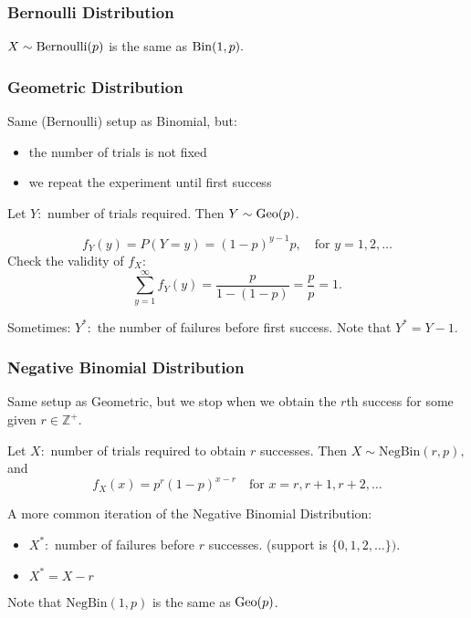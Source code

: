 \subsubsection{Bernoulli Distribution}

$X\sim\operatorname*{Bernoulli}(p)$ is the same as $\operatorname*{Bin}(1,p).$

\subsubsection{Geometric Distribution}

Same (Bernoulli) setup as Binomial, but:
\begin{itemize}
    \item the number of trials is not fixed
    \item we repeat the experiment until first success 
\end{itemize}
Let $Y:$ number of trials required. Then $Y\sim \operatorname*{Geo}(p)$.

$$ f_Y(y)=P(Y=y)=(1-p)^{y-1}p, \quad \text{for $y=1,2,\dots$}$$
Check the validity of $f_X$: 
$$\sum^\infty_{y=1} f_Y(y)=\frac{p}{1-(1-p)}=\frac{p}{p}=1.$$

Sometimes: $Y^*:$ the number of failures before first success. Note that $Y^*=Y-1.$

\subsubsection{Negative Binomial Distribution}
Same setup as Geometric, but we stop when we obtain the $r$th success for some given $r\in \mathbb Z^+.$

Let $X:$ number of trials required to obtain $r$ successes. Then $X\sim \text{NegBin}(r,p),$ and
$$f_X(x)=p^r(1-p)^{x-r} \quad \text{for } x=r, r+1,r+2,\dots$$

A more common iteration of the Negative Binomial Distribution:
\begin{itemize}
    \item $X^*:$ number of failures before $r$ successes. (support is $\{0,1,2,\dots\}).$
    \item $X^*=X-r$
\end{itemize}
Note that $\text{NegBin}(1,p)$ is the same as $\operatorname*{Geo}(p)$.
